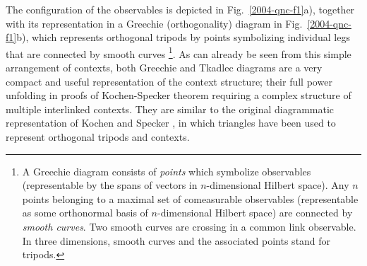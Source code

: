 \documentclass[12pt]{iopart}
\begin{document}
The configuration of the observables
is depicted in Fig.~\ref{2004-qnc-f1}a),
together with its representation in a Greechie (orthogonality) diagram
\cite{greechie:71} in Fig.~\ref{2004-qnc-f1}b),
which represents orthogonal tripods by points symbolizing
individual legs that are connected by smooth curves
\footnote{
A Greechie diagram consists of {\em points} which
symbolize observables (representable by the spans of vectors
in $n$-dimensional Hilbert space).
Any $n$ points belonging to a maximal set of comeasurable observables
(representable as some orthonormal basis of  $n$-dimensional Hilbert space)
are connected by {\em smooth curves}. Two smooth curves are crossing in a common link observable.
In three dimensions, smooth curves and the associated points stand for tripods.
}.
As can already be seen from this simple arrangement of contexts,
both Greechie and Tkadlec diagrams are a very compact and useful
representation of the context structure;
their full power unfolding
in proofs of Kochen-Specker theorem \cite{svozil-tkadlec,tkadlec-96,tkadlec-00}
requiring a complex structure of multiple interlinked contexts.
They are similar to the original diagrammatic representation of Kochen and Specker \cite{kochen1},
in which triangles have been used to represent orthogonal tripods and contexts.
\end{document}
